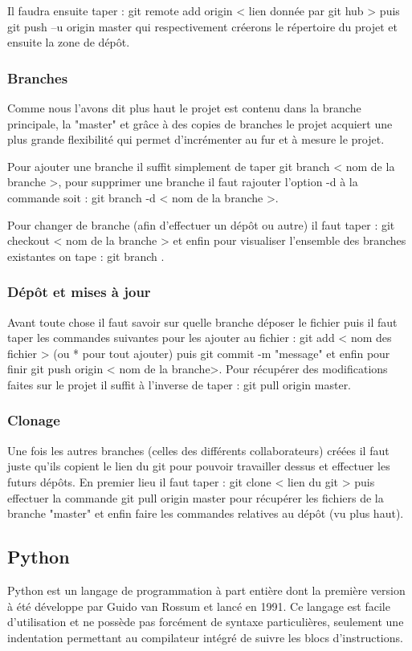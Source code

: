 \documentclass[a4paper, 12pt, twoside]{article}
\begin{document}
Il faudra  ensuite taper :  git remote add origin < lien donnée par git hub >  puis  git push –u origin master  qui respectivement créerons le répertoire du projet et ensuite la zone de dépôt.

\subsubsection{Branches}
Comme nous l'avons dit plus haut le projet est contenu dans la branche principale, la "master" et grâce à des copies de branches le projet acquiert une plus grande flexibilité qui permet d'incrémenter au fur et à mesure le projet. \newline

Pour ajouter une branche il suffit simplement de taper  git branch < nom de la branche >, pour supprimer une branche il faut rajouter l'option -d à la commande soit :  git branch -d < nom de la branche >.\newline

Pour changer de branche (afin d'effectuer un dépôt ou autre) il faut taper :  git checkout < nom de la branche > et enfin pour visualiser l'ensemble des branches existantes on tape :  git branch .

\subsubsection{Dépôt et mises à jour}
Avant toute chose il faut savoir sur quelle branche déposer le fichier puis il faut taper les commandes suivantes pour les ajouter  au fichier :  git add < nom des fichier >  (ou * pour tout ajouter) puis  git commit -m "message"  et enfin pour finir git push origin < nom de la branche>. \newline
Pour récupérer des modifications faites sur le projet il suffit à l'inverse de taper : 
 git pull origin master.
 
\subsubsection{Clonage}
Une fois les autres branches (celles des différents collaborateurs) créées il faut juste qu'ils copient le lien du git pour pouvoir travailler dessus et effectuer les futurs dépôts. En premier lieu il faut taper :  git clone < lien du git >  puis effectuer la commande git pull origin master  pour récupérer les fichiers de la branche "master" et enfin faire les commandes relatives au dépôt (vu plus haut).

\subsection{Python}
Python est un langage de programmation à part entière dont la première version à été développe par \textsf{Guido van Rossum} et lancé en 1991. Ce langage est facile d'utilisation et ne possède pas forcément de syntaxe particulières, seulement une indentation permettant au compilateur intégré de suivre les blocs d'instructions. \newline
\end{document}
